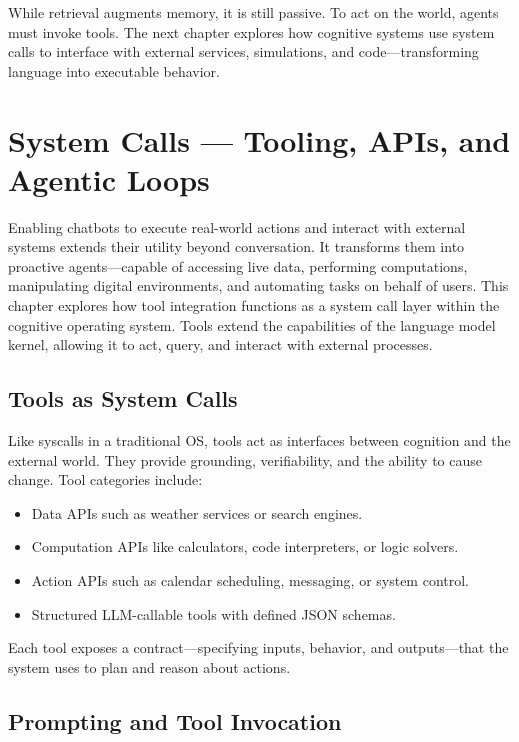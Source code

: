 \documentclass{book}
\begin{document}
While retrieval augments memory, it is still passive. To act on the world, agents must invoke tools. The next chapter explores how cognitive systems use system calls to interface with external services, simulations, and code—transforming language into executable behavior.

\chapter{System Calls — Tooling, APIs, and Agentic Loops}

Enabling chatbots to execute real-world actions and interact with external systems extends their utility beyond conversation. It transforms them into proactive agents—capable of accessing live data, performing computations, manipulating digital environments, and automating tasks on behalf of users. This chapter explores how tool integration functions as a system call layer within the cognitive operating system. Tools extend the capabilities of the language model kernel, allowing it to act, query, and interact with external processes.

\section{Tools as System Calls}

Like syscalls in a traditional OS, tools act as interfaces between cognition and the external world. They provide grounding, verifiability, and the ability to cause change. Tool categories include:

\begin{itemize}
  \item Data APIs such as weather services or search engines.
  \item Computation APIs like calculators, code interpreters, or logic solvers.
  \item Action APIs such as calendar scheduling, messaging, or system control.
  \item Structured LLM-callable tools with defined JSON schemas.
\end{itemize}

Each tool exposes a contract—specifying inputs, behavior, and outputs—that the system uses to plan and reason about actions.

\section{Prompting and Tool Invocation}
\end{document}
